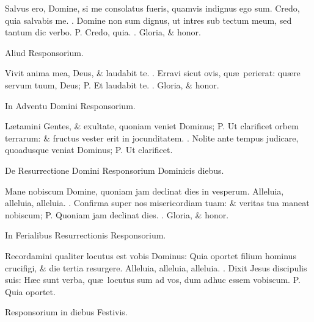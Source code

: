\documentclass[letter,11pt]{book}
\makeatletter
\DeclareRobustCommand{\Vbar}{\vers@resp{-0.1em}{V}}
\newcommand{\vers@resp@sym}{\raisebox{0.2ex}{\rotatebox[origin=c]{-20}{$\m@th\rceil$}}}
\newcommand{\vers@resp}[2]{%
  {\ooalign{\hidewidth\kern#1\vers@resp@sym\hidewidth\cr#2\cr}}%
}%
\def\P{\color{Red} P. \color{black}}
\def\V{\color{Red} \Vbar . \color{black}}
\makeatother
\begin{document}
\begin{multicols*}{2}
\par \noindent Salvus ero, Domine, si me consolatus fueris, quamvis indignus ego sum. Credo, quia salvabis me. \V Domine non sum dignus, ut intres sub tectum meum, sed tantum dic verbo. \P Credo, quia. \V Gloria, \& honor.
\vspace{-.5em} \begin{center} \color{Red} Aliud Responsorium. \end{center} \vspace{-.5em}
\par \noindent Vivit anima mea, Deus, \& laudabit te. \V Erravi sicut ovis, qu\ae \ perierat: qu\ae re servum tuum, Deus; \P Et laudabit te. \V Gloria, \& honor.
\vspace{-.5em} \begin{center} \color{Red} In Adventu Domini Responsorium. \end{center} \vspace{-.5em}
\par \noindent L\ae tamini Gentes, \& exultate, quoniam veniet Dominus; \P Ut clarificet orbem terrarum: \& fructus vester erit in jocunditatem. \V Nolite ante tempus judicare, quoadusque veniat Dominus; \P Ut clarificet.
\vspace{-.5em} \begin{center} \color{Red} De Resurrectione Domini Responsorium Dominicis diebus. \end{center} \vspace{-.5em}
\par \noindent Mane nobiscum Domine, quoniam jam declinat dies in vesperum. Alleluia, alleluia, alleluia. \V Confirma super nos misericordiam tuam: \& veritas tua maneat nobiscum; \P Quoniam jam declinat dies. \V Gloria, \& honor.
\vspace{-.5em} \begin{center} \color{Red} In Ferialibus Resurrectionis Responsorium. \end{center} \vspace{-.5em}
\par \noindent Recordamini qualiter locutus est vobis Dominus: Quia oportet filium hominus crucifigi, \& die tertia resurgere. Alleluia, alleluia, alleluia. \V Dixit Jesus discipulis suis: H\ae c sunt verba, qu\ae \ locutus sum ad vos, dum adhuc
essem vobiscum. \P Quia oportet.
\vspace{-.5em} \begin{center} \color{Red} Responsorium in diebus Festivis. \end{center} \vspace{-.5em}

\end{multicols*}
\end{document}
